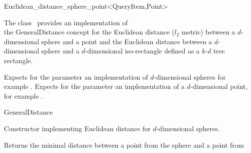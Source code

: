 

\begin{ccRefClass}{Euclidean_distance_sphere_point<QueryItem,Point>}  %


\ccDefinition
  
The class \ccRefName\ provides an implementation of \\
the GeneralDistance concept
for the Euclidean distance ($l_2$ metric) between a $d$-dimensional sphere and a point and 
the Euclidean distance between a $d$-dimensional sphere
and a $d$-dimensional iso-rectangle defined as a $k$-$d$ tree rectangle.


\ccParameters

Expects for the parameter 
an implementation of $d$-dimensional spheres
for example .
Expects for the parameter  an implementation
of a $d$-dimensional point, for example .

\ccIsModel

GeneralDistance

\ccTypes


\ccCreation
{}  %


{Constructor implementing Euclidean distance for
$d$-dimensional spheres.}

\ccOperations


{Returns the minimal distance between a point from the sphere  and a point from
}


\end{ccRefClass}
